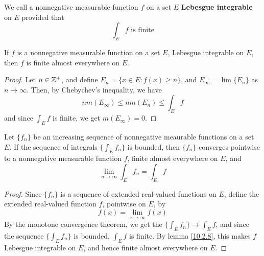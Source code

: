 \begin{definition}
    We call a nonnegative measurable function $f$ on a set  $E$
    \textbf{Lebesgue integrable} on $E$ provided that
    \begin{equation*}
        \int_E{f} \text{ is finite}
    \end{equation*}
\end{definition}

\begin{lemma}\label{10.2.8}
    If $f$ is a nonnegative measurable function on a set  $E$, Lebesgue
    integrable on  $E$, then  $f$ is finite almost everywhere on  $E$.
\end{lemma}
\begin{proof}
    Let $n \in \mathbb{Z}^+$, and define  $E_n=\{x \in E : f(x) \geq n\}$, and
    $E_\infty=\lim{\{E_n\}}$ as $n \xrightarrow{} \infty$. Then, by Chebychev's
    inequality, we have
    \begin{equation*}
        nm(E_\infty) \leq nm(E_n) \leq \int_E{f}
    \end{equation*}
    and since $\int_E{f}$ is finite, we get $m(E_\infty)=0$.
\end{proof}

\begin{lemma}\label{10.2.9}
    Let $\{f_n\}$ be an increasing sequence of nonnegative meaurable functions
    on a set $E$. If the sequence of integrals  $\{\int_E{f_n}\}$ is bounded,
    then $\{f_n\}$ converges pointwise to a nonnegative measurable function $f$,
    finite almost everywhere on $E$, and
    \begin{equation*}
        \lim_{n \xrightarrow{} \infty}{\int_E{f_n}}=\int_E{f}
    \end{equation*}
\end{lemma}
\begin{proof}
    Since $\{f_n\}$ is a sequence of extended real-valued functions on $E$,
    define the extended real-valued function $f$, pointwise on  $E$, by
    \begin{equation*}
        f(x)=\lim_{x \xrightarrow{} \infty}{f(x)}
    \end{equation*}
    By the monotone convergence theorem, we get the $\{\int_E{f_n}\}
    \xrightarrow{} \int_E{f}$, and since the sequence $\{\int_E{f_n}\}$ is
    bounded, $\int_E{f}$ is finite. By lemma \ref{10.2.8}, this makes $f$
    Lebesgue integrable on $E$, and hence finite almost everywhere on  $E$.
\end{proof}
